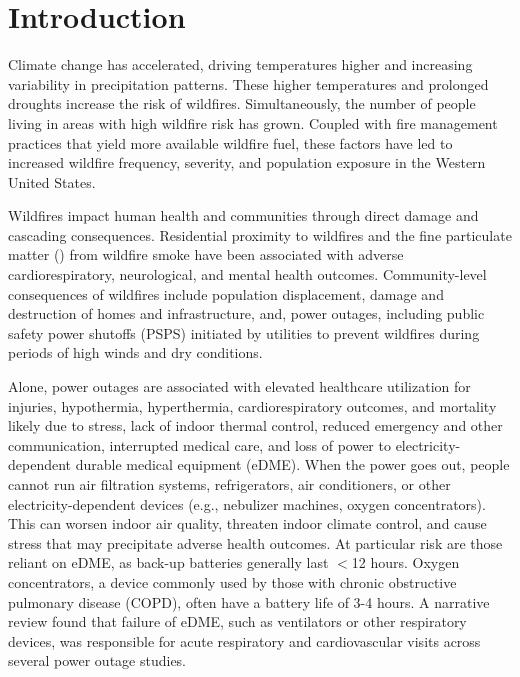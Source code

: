 \documentclass[../main.tex]{subfiles}
\begin{document}
\section{Introduction}
Climate change has accelerated, driving temperatures higher and increasing variability in precipitation patterns. These higher temperatures and prolonged droughts increase the risk of wildfires. Simultaneously, the number of people living in areas with high wildfire risk has grown.\citep{burke2021changing, radeloff2018rapid} Coupled with fire management practices that yield more available wildfire fuel,\citep{burke2021changing} these factors have led to increased wildfire frequency, severity, and population exposure in the Western United States.\citep{casey2024measuring, radeloff2018rapid, burke2021changing} 

Wildfires impact human health and communities through direct damage and cascading consequences.\citep{casey2024measuring} Residential proximity to wildfires and the fine particulate matter (\PM) from wildfire smoke have been associated with adverse cardiorespiratory, neurological, and mental health outcomes.\citep{mcbrien_wildfire_2023, gould2024health, wang2025differential} Community-level consequences of wildfires include population displacement, damage and destruction of homes and infrastructure, and, power outages, including public safety power shutoffs (PSPS) initiated by utilities to prevent wildfires during periods of high winds and dry conditions.\citep{hamideh2022wildfire, gordon2025wildfire}

Alone, power outages are associated with elevated healthcare utilization for injuries, hypothermia, hyperthermia, cardiorespiratory outcomes, and mortality likely due to stress, lack of indoor thermal control, reduced emergency and other communication, interrupted medical care, and loss of power to electricity-dependent durable medical equipment (eDME).\citep{casey2020power, northrop2024power, lin2021immediate} When the power goes out, people cannot run air filtration systems, refrigerators, air conditioners, or other electricity-dependent devices (e.g., nebulizer machines, oxygen concentrators).\citep{casey2020power} This can worsen indoor air quality, threaten indoor climate control, and cause stress that may precipitate adverse health outcomes. At particular risk are those reliant on eDME, as back-up batteries generally last $<$12 hours.\citep{molinari2017s} Oxygen concentrators, a device commonly used by those with chronic obstructive pulmonary disease (COPD), often have a battery life of 3-4 hours.\citep{molinari2017s} A narrative review found that failure of eDME, such as ventilators or other respiratory devices, was responsible for acute respiratory and cardiovascular visits across several power outage studies.\citep{casey2020power}
\end{document}

